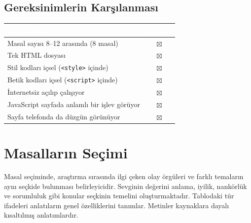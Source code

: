 \documentclass[12pt,a4paper]{article}
\begin{document}
\subsection{Gereksinimlerin Karşılanması}
\begin{center}
\begin{tabular}{@{}p{8.2cm}c@{}}
\toprule
\rowcolor{ana}\textcolor{white}{\textbf{Gereksinim}} & \textcolor{white}{\textbf{Durum}} \\
\midrule
Masal sayısı 8--12 arasında (8 masal)         & $\boxtimes$ \\
Tek HTML dosyası                                    & $\boxtimes$ \\
Stil kodları içsel (\texttt{<style>} içinde)        & $\boxtimes$ \\
Betik kodları içsel (\texttt{<script>} içinde)      & $\boxtimes$ \\
İnternetsiz açılıp çalışıyor                        & $\boxtimes$ \\
JavaScript sayfada anlamlı bir işlev görüyor        & $\boxtimes$ \\
Sayfa telefonda da düzgün görünüyor                 & $\boxtimes$ \\
\bottomrule
\end{tabular}
\end{center}


\section{Masalların Seçimi}
Masal seçiminde, araştırma sırasında ilgi çeken olay örgüleri ve farklı temaların aynı seçkide bulunması belirleyicidir. Sevginin değerini anlama, iyilik, nankörlük ve sorumluluk gibi konular seçkinin temelini oluşturmaktadır. Tablodaki tür ifadeleri anlatıların genel özelliklerini tanımlar. Metinler kaynaklara dayalı kısaltılmış anlatımlardır.

\end{document}
